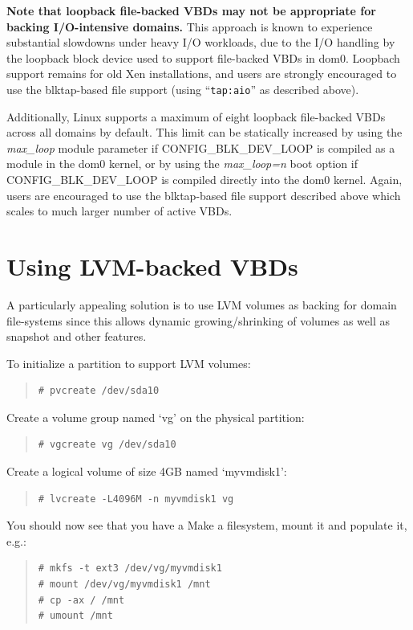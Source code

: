 \documentclass[11pt,twoside,final,openright]{report}
\begin{document}
{\bf Note that loopback file-backed VBDs may not be appropriate for backing
  I/O-intensive domains.}  This approach is known to experience
substantial slowdowns under heavy I/O workloads, due to the I/O
handling by the loopback block device used to support file-backed VBDs
in dom0.  Loopbach support remains for old Xen installations, and users
are strongly encouraged to use the blktap-based file support (using 
``{\tt{tap:aio}}'' as described above).

Additionally, Linux supports a maximum of eight loopback file-backed 
VBDs across all domains by default.  This limit can be statically 
increased by using the \emph{max\_loop} module parameter if 
CONFIG\_BLK\_DEV\_LOOP is compiled as a module in the dom0 kernel, or 
by using the \emph{max\_loop=n} boot option if CONFIG\_BLK\_DEV\_LOOP 
is compiled directly into the dom0 kernel.  Again, users are encouraged
to use the blktap-based file support described above which scales to much 
larger number of active VBDs.


\section{Using LVM-backed VBDs}
\label{s:using-lvm-backed-vbds}

A particularly appealing solution is to use LVM volumes as backing for
domain file-systems since this allows dynamic growing/shrinking of
volumes as well as snapshot and other features.

To initialize a partition to support LVM volumes:
\begin{quote}
\begin{verbatim}
# pvcreate /dev/sda10           
\end{verbatim} 
\end{quote}

Create a volume group named `vg' on the physical partition:
\begin{quote}
\begin{verbatim}
# vgcreate vg /dev/sda10
\end{verbatim} 
\end{quote}

Create a logical volume of size 4GB named `myvmdisk1':
\begin{quote}
\begin{verbatim}
# lvcreate -L4096M -n myvmdisk1 vg
\end{verbatim}
\end{quote}

You should now see that you have a  Make a
filesystem, mount it and populate it, e.g.:
\begin{quote}
\begin{verbatim}
# mkfs -t ext3 /dev/vg/myvmdisk1
# mount /dev/vg/myvmdisk1 /mnt
# cp -ax / /mnt
# umount /mnt
\end{verbatim}
\end{quote}
\end{document}
